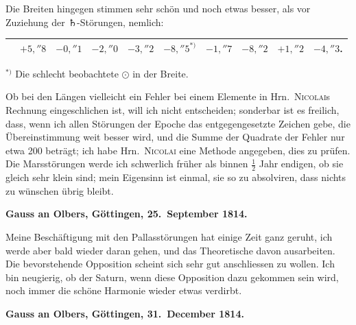 \documentclass[12pt,a4paper]{article}
\newcommand{\Ceres}{\odot}
\begin{document}
Die Breiten hingegen stimmen sehr schön und noch etwas besser, als vor Zuziehung der $\Saturn$-Störungen, nemlich:
\begin{center}
\begin{tabular}{l@{\quad}r@{\quad}r@{\quad}r@{\quad}r@{\quad}r@{\quad}r@{\quad}r@{\quad}r@{\quad}r}
\toprule
& $+5{,}''8$ & $-0{,}''1$ & $-2{,}''0$ & $-3{,}''2$ & $-8{,}''5^{*)}$ & $-1{,}''7$ & $-8{,}''2$ & $+1{,}''2$ & $-4{,}''3$. \\
\bottomrule
\end{tabular}
\end{center}
\smallskip\noindent$^{*)}$ Die schlecht beobachtete $\Ceres$ in der Breite.

\newpage
\setcounter{page}{435}
%
Ob bei den Längen vielleicht ein Fehler bei einem Elemente in Hrn.~\textsc{Nicolai}s Rechnung eingeschlichen ist, will ich nicht entscheiden; sonderbar ist es freilich, dass, wenn ich allen Störungen der Epoche das entgegengesetzte Zeichen gebe, die Übereinstimmung weit besser wird, und die Summe der Quadrate der Fehler nur etwa 200 beträgt; ich habe Hrn.~\textsc{Nicolai} eine Methode angegeben, dies zu prüfen. Die Marsstörungen werde ich schwerlich früher als binnen $\frac{1}{2}$ Jahr endigen, ob sie gleich sehr klein sind; mein Eigensinn ist einmal, sie so zu absolviren, dass nichts zu wünschen übrig bleibt.

\medskip\noindent
\textbf{Gauss an Olbers, Göttingen, 25.~September 1814.}

Meine Beschäftigung mit den Pallasstörungen hat einige Zeit ganz geruht, ich werde aber bald wieder daran gehen, und das Theoretische davon ausarbeiten. Die bevorstehende Opposition scheint sich sehr gut anschliessen zu wollen. Ich bin neugierig, ob der Saturn, wenn diese Opposition dazu gekommen sein wird, noch immer die schöne Harmonie wieder etwas verdirbt.

\medskip\noindent
\textbf{Gauss an Olbers, Göttingen, 31.~December 1814.}
\end{document}
